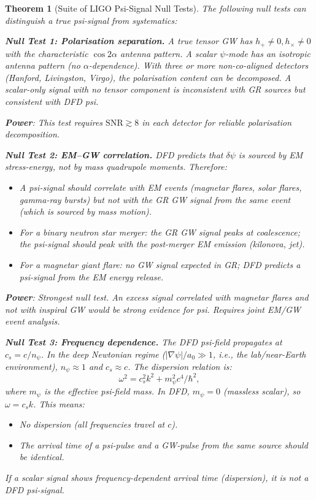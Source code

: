 \documentclass[11pt]{article}
\newcommand{\SNR}{\mathrm{SNR}}
\newtheorem{theorem}{Theorem}[section]
\theoremstyle{definition}
\theoremstyle{remark}
\begin{document}
\begin{theorem}[Suite of LIGO Psi-Signal Null Tests]
\label{thm:null_tests}
The following null tests can distinguish a true psi-signal from
systematics:

\textbf{Null Test 1: Polarisation separation.}
A true tensor GW has $h_+ \neq 0, h_\times \neq 0$ with the
characteristic $\cos 2\alpha$ antenna pattern. A scalar $\psi$-mode
has an isotropic antenna pattern (no $\alpha$-dependence). With three
or more non-co-aligned detectors (Hanford, Livingston, Virgo),
the polarisation content can be decomposed. A scalar-only signal
with no tensor component is inconsistent with GR sources but
consistent with DFD psi.

\textbf{Power}: This test requires $\SNR \gtrsim 8$ in each
detector for reliable polarisation decomposition.

\textbf{Null Test 2: EM--GW correlation.}
DFD predicts that $\delta\psi$ is sourced by EM stress-energy,
not by mass quadrupole moments. Therefore:
\begin{itemize}[nosep]
\item A psi-signal should correlate with EM events (magnetar flares,
  solar flares, gamma-ray bursts) but \emph{not} with the GR GW
  signal from the same event (which is sourced by mass motion).
\item For a binary neutron star merger: the GR GW signal peaks at
  coalescence; the psi-signal should peak with the post-merger EM
  emission (kilonova, jet).
\item For a magnetar giant flare: no GW signal expected in GR; DFD
  predicts a psi-signal from the EM energy release.
\end{itemize}

\textbf{Power}: Strongest null test. An excess signal correlated
with magnetar flares and \emph{not} with inspiral GW would be
strong evidence for psi. Requires joint EM/GW event analysis.

\textbf{Null Test 3: Frequency dependence.}
The DFD psi-field propagates at $c_s = c/n_\psi$. In the deep
Newtonian regime ($|\nabla\psi|/a_0 \gg 1$, i.e., the lab/near-Earth
environment), $n_\psi \approx 1$ and $c_s \approx c$. The
dispersion relation is:
\begin{equation}
\omega^2 = c_s^2 k^2 + m_\psi^2 c^4/\hbar^2,
\end{equation}
where $m_\psi$ is the effective psi-field mass. In DFD,
$m_\psi = 0$ (massless scalar), so $\omega = c_s k$. This means:
\begin{itemize}[nosep]
\item No dispersion (all frequencies travel at $c$).
\item The arrival time of a psi-pulse and a GW-pulse from the same
  source should be identical.
\end{itemize}
If a scalar signal shows frequency-dependent arrival time (dispersion),
it is not a DFD psi-signal.


\end{theorem}
\end{document}
